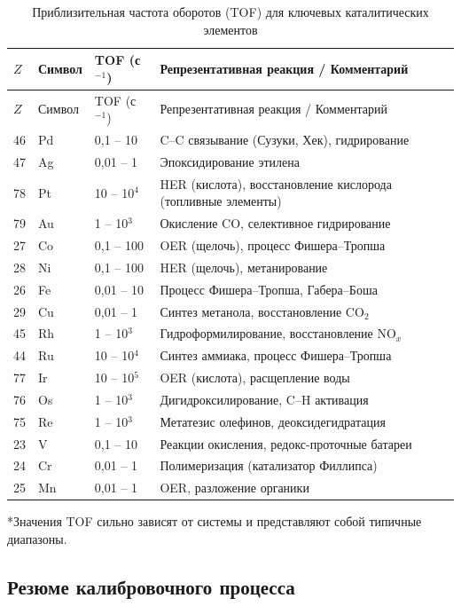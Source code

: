 \documentclass[12pt,a4paper]{article}
\begin{document}
	\begin{longtable}{p{1.2cm}p{1.2cm}p{3.0cm}p{6.5cm}}
		\caption{Приблизительная частота оборотов (TOF) для ключевых каталитических элементов} \label{tab:tof-data} \\
		\toprule
		\(Z\) & Символ & TOF (с\(^{-1}\)) & Репрезентативная реакция / Комментарий \\
		\midrule
		\endfirsthead
		\toprule
		\(Z\) & Символ & TOF (с\(^{-1}\)) & Репрезентативная реакция / Комментарий \\
		\midrule
		\endhead
		46 & Pd & 0,1 – 10 & C–C связывание (Сузуки, Хек), гидрирование \\
		47 & Ag & 0,01 – 1 & Эпоксидирование этилена \\
		78 & Pt & 10 – 10\(^4\) & HER (кислота), восстановление кислорода (топливные элементы) \\
		79 & Au & 1 – 10\(^3\) & Окисление CO, селективное гидрирование \\
		27 & Co & 0,1 – 100 & OER (щелочь), процесс Фишера–Тропша \\
		28 & Ni & 0,1 – 100 & HER (щелочь), метанирование \\
		26 & Fe & 0,01 – 10 & Процесс Фишера–Тропша, Габера–Боша \\
		29 & Cu & 0,01 – 1 & Синтез метанола, восстановление CO\(_2\) \\
		45 & Rh & 1 – 10\(^3\) & Гидроформилирование, восстановление NO\(_x\) \\
		44 & Ru & 10 – 10\(^4\) & Синтез аммиака, процесс Фишера–Тропша \\
		77 & Ir & 10 – 10\(^5\) & OER (кислота), расщепление воды \\
		76 & Os & 1 – 10\(^3\) & Дигидроксилирование, C–H активация \\
		75 & Re & 1 – 10\(^3\) & Метатезис олефинов, деоксидегидратация \\
		23 & V  & 0,1 – 10 & Реакции окисления, редокс-проточные батареи \\
		24 & Cr & 0,01 – 1 & Полимеризация (катализатор Филлипса) \\
		25 & Mn & 0,01 – 1 & OER, разложение органики \\
		\bottomrule
	\end{longtable}
	*Значения TOF сильно зависят от системы и представляют собой типичные диапазоны.
	
	\subsection{Резюме калибровочного процесса}
	
\end{document}
